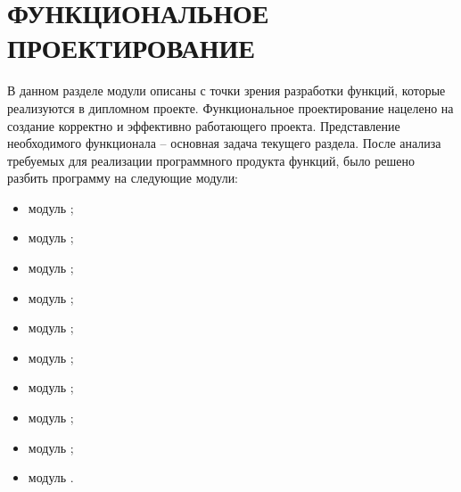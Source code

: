 \section{ФУНКЦИОНАЛЬНОЕ ПРОЕКТИРОВАНИЕ}
\label{sec:func}


В данном разделе модули описаны с точки зрения разработки функций, которые реализуются в дипломном проекте.
Функциональное проектирование нацелено на создание корректно и эффективно работающего проекта.
Представление необходимого функционала -- основная задача текущего раздела.
После анализа требуемых для реализации программного продукта функций, было решено разбить программу на следующие модули:

\begin{itemize}
    \item модуль \moduleAuth;
    \item модуль \moduleStripe;
    \item модуль \moduleTrading;
    \item модуль \moduleAutoTrading;
    \item модуль \moduleNotifications;
    \item модуль \moduleCommunicationPostgres;
    \item модуль \moduleCommunication;
    \item модуль \moduleParsing;
    \item модуль \moduleStatistics;
    \item модуль \moduleCommunicationMongoDB.
\end{itemize}

